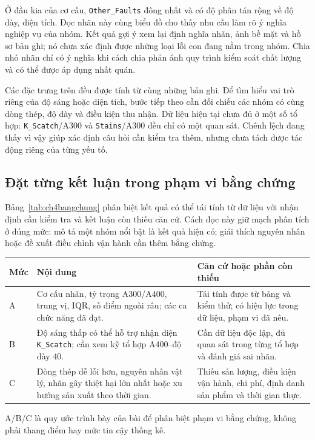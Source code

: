 \documentclass[12pt,a4paper,oneside]{report}
\newcommand{\maCot}[1]{{\urlstyle{tt}\def\UrlBreaks{\do\_\do\/\do\.}\def\UrlBigBreaks{}\nolinkurl{#1}}}
\begin{document}
Ở đầu kia của cơ cấu, \maCot{Other_Faults} đông nhất và có độ phân tán rộng về độ dày, diện tích. Đọc nhãn này cùng biểu đồ cho thấy nhu cầu làm rõ ý nghĩa nghiệp vụ của nhóm. Kết quả gợi ý xem lại định nghĩa nhãn, ảnh bề mặt và hồ sơ bản ghi; nó chưa xác định được những loại lỗi con đang nằm trong nhóm. Chia nhỏ nhãn chỉ có ý nghĩa khi cách chia phản ánh quy trình kiểm soát chất lượng và có thể được áp dụng nhất quán.

Các đặc trưng trên đều được tính từ cùng những bản ghi. Để tìm hiểu vai trò riêng của độ sáng hoặc diện tích, bước tiếp theo cần đối chiếu các nhóm có cùng dòng thép, độ dày và điều kiện thu nhận. Dữ liệu hiện tại chưa đủ ở một số tổ hợp: \maCot{K_Scatch}/A300 và \maCot{Stains}/A300 đều chỉ có một quan sát. Chênh lệch đang thấy vì vậy giúp xác định câu hỏi cần kiểm tra thêm, nhưng chưa tách được tác động riêng của từng yếu tố.

\subsection{Đặt từng kết luận trong phạm vi bằng chứng}

Bảng~\ref{tab:ch4bangchung} phân biệt kết quả có thể tái tính từ dữ liệu với nhận định cần kiểm tra và kết luận còn thiếu căn cứ. Cách đọc này giữ mạch phân tích ở đúng mức: mô tả một nhóm nổi bật là kết quả hiện có; giải thích nguyên nhân hoặc đề xuất điều chỉnh vận hành cần thêm bằng chứng.

\begin{center}\begin{minipage}{\linewidth}
\label{tab:ch4bangchung}
\small{}
\begin{tabularx}{\linewidth}{@{}p{0.8cm}Y Y@{}}
\toprule
Mức & Nội dung & Căn cứ hoặc phần còn thiếu \\
\midrule
A & Cơ cấu nhãn, tỷ trọng A300/A400, trung vị, IQR, số điểm ngoài râu; các ca chức năng đã đạt. & Tái tính được từ bảng và kiểm thử; có hiệu lực trong dữ liệu, phạm vi đã nêu. \\
B & Độ sáng thấp có thể hỗ trợ nhận diện \maCot{K_Scatch}; cần xem kỹ tổ hợp A400--độ dày 40. & Cần dữ liệu độc lập, đủ quan sát trong từng tổ hợp và đánh giá sai nhãn. \\
C & Dòng thép dễ lỗi hơn, nguyên nhân vật lý, nhãn gây thiệt hại lớn nhất hoặc xu hướng sản xuất theo thời gian. & Thiếu sản lượng, điều kiện vận hành, chi phí, định danh sản phẩm và thời gian thực. \\
\bottomrule
\end{tabularx}
\smallskip
\par\raggedright\footnotesize A/B/C là quy ước trình bày của bài để phân biệt phạm vi bằng chứng, không phải thang điểm hay mức tin cậy thống kê.
\end{minipage}\end{center}
\end{document}
